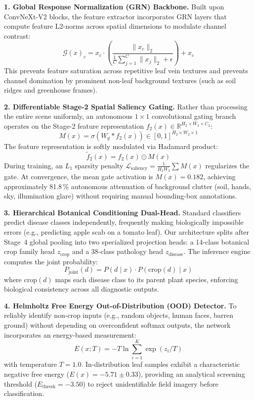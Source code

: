 \textbf{1. Global Response Normalization (GRN) Backbone.} Built upon ConvNeXt-V2 blocks,
the feature extractor incorporates GRN layers that compute feature L2-norms across spatial
dimensions to modulate channel contrast:
\begin{equation}
\mathcal{G}(x)_c = x_c \cdot \left( \frac{\|x_c\|_2}{\frac{1}{C}\sum_{j=1}^C \|x_j\|_2 + \epsilon} \right) + x_c
\end{equation}
This prevents feature saturation across repetitive leaf vein textures and prevents channel
domination by prominent non-leaf background textures (such as soil ridges and greenhouse frames).

\textbf{2. Differentiable Stage-2 Spatial Saliency Gating.} Rather than processing the entire
scene uniformly, an autonomous $1 \times 1$ convolutional gating branch operates on the Stage-2
feature representation $f_2(x) \in \mathbb{R}^{H_2 \times W_2 \times C_2}$:
\begin{equation}
M(x) = \sigma(W_g * f_2(x)) \in [0, 1]^{H_2 \times W_2 \times 1}
\end{equation}
The feature representation is softly modulated via Hadamard product:
\begin{equation}
\tilde{f}_2(x) = f_2(x) \odot M(x)
\end{equation}
During training, an $L_1$ sparsity penalty $\mathcal{L}_{\text{saliency}} = \frac{1}{H_2 W_2}\sum M(x)$
regularizes the gate. At convergence, the mean gate activation is $M(x) = 0.182$, achieving
approximately 81.8\,\% autonomous attenuation of background clutter (soil, hands, sky, illumination
glare) without requiring manual bounding-box annotations.

\textbf{3. Hierarchical Botanical Conditioning Dual-Head.} Standard classifiers predict
disease classes independently, frequently making biologically impossible errors (e.g., predicting
apple scab on a tomato leaf). Our architecture splits after Stage~4 global pooling into two
specialized projection heads: a 14-class botanical crop family head $z_{\text{crop}}$ and a
38-class pathology head $z_{\text{disease}}$. The inference engine computes the joint probability:
\begin{equation}
P_{\text{joint}}(d) = P(d \mid x) \cdot P(\text{crop}(d) \mid x)
\end{equation}
where $\text{crop}(d)$ maps each disease class to its parent plant species, enforcing biological
consistency across all diagnostic outputs.

\textbf{4. Helmholtz Free Energy Out-of-Distribution (OOD) Detector.} To reliably identify
non-crop inputs (e.g., random objects, human faces, barren ground) without depending on overconfident
softmax outputs, the network incorporates an energy-based measurement:
\begin{equation}
E(x; T) = -T \ln \sum_{i=1}^K \exp(z_i / T)
\end{equation}
with temperature $T=1.0$. In-distribution leaf samples exhibit a characteristic negative free
energy ($E(x) = -5.71 \pm 0.33$), providing an analytical screening threshold ($E_{\text{thresh}} = -3.50$)
to reject unidentifiable field imagery before classification.

